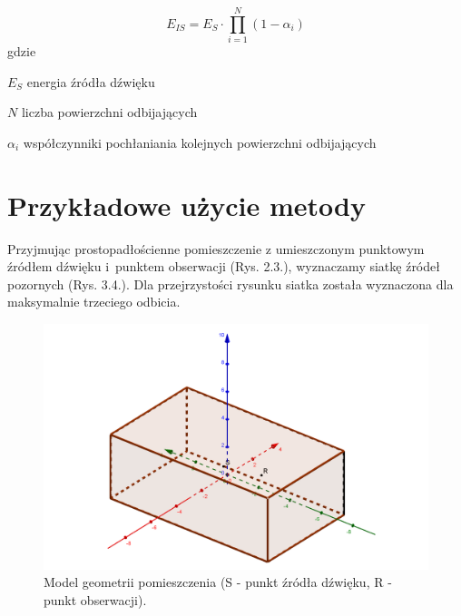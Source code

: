 \begin{equation}
E_{IS}=E_{S}\cdot\prod_{i=1}^{N}(1-\alpha_i)
\end{equation}
gdzie
\begin{eqwhere}[2cm]
        \item[$E_{S}$] energia źródła dźwięku
        \item[$N$] liczba powierzchni odbijających
        \item[$\alpha_i$] współczynniki pochłaniania kolejnych powierzchni odbijających
\end{eqwhere}


\section{Przykładowe użycie metody}\label{sec:przyuzy}

Przyjmując prostopadłościenne pomieszczenie z umieszczonym punktowym źródłem dźwięku i~punktem obserwacji (Rys. 2.3.), wyznaczamy siatkę źródeł pozornych (Rys. 3.4.). Dla przejrzystości rysunku siatka została wyznaczona dla maksymalnie trzeciego odbicia.
 
\begin{figure}[H]
        \centering
                \centering
                \includegraphics[width=12cm]{rys3}
	\caption{Model geometrii pomieszczenia (S - punkt źródła dźwięku, R - punkt obserwacji).}
\end{figure}

